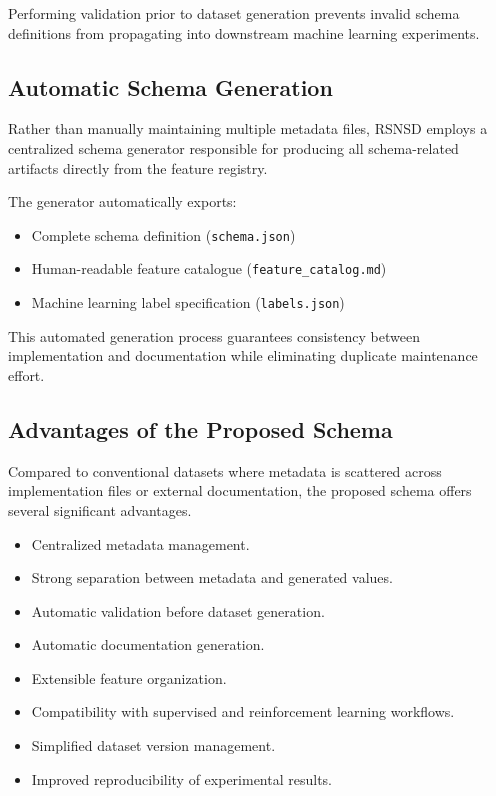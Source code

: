 \documentclass[12pt,a4paper]{article}
\begin{document}
Performing validation prior to dataset generation prevents invalid schema definitions from propagating into downstream machine learning experiments.

\subsection{Automatic Schema Generation}

Rather than manually maintaining multiple metadata files, RSNSD employs a centralized schema generator responsible for producing all schema-related artifacts directly from the feature registry.

The generator automatically exports:

\begin{itemize}
	
	\item Complete schema definition (\texttt{schema.json})
	
	\item Human-readable feature catalogue (\texttt{feature\_catalog.md})
	
	\item Machine learning label specification (\texttt{labels.json})
	
\end{itemize}

This automated generation process guarantees consistency between implementation and documentation while eliminating duplicate maintenance effort.

\subsection{Advantages of the Proposed Schema}

Compared to conventional datasets where metadata is scattered across implementation files or external documentation, the proposed schema offers several significant advantages.

\begin{itemize}
	
	\item Centralized metadata management.
	
	\item Strong separation between metadata and generated values.
	
	\item Automatic validation before dataset generation.
	
	\item Automatic documentation generation.
	
	\item Extensible feature organization.
	
	\item Compatibility with supervised and reinforcement learning workflows.
	
	\item Simplified dataset version management.
	
	\item Improved reproducibility of experimental results.
	
\end{itemize}
\end{document}

